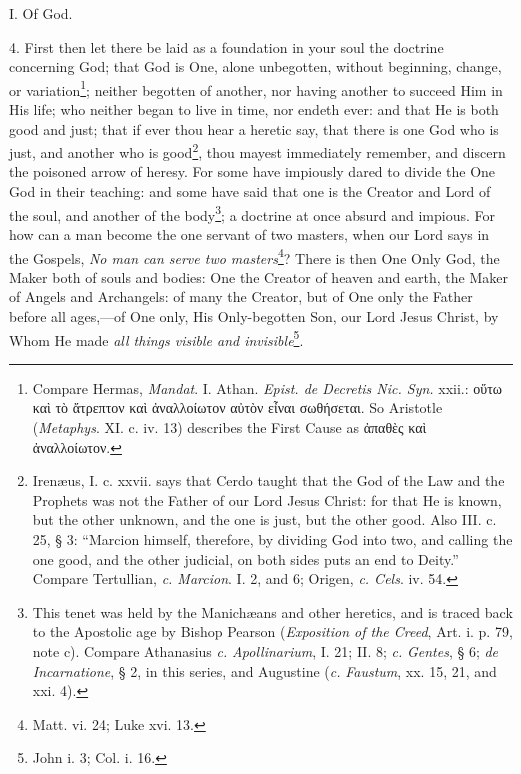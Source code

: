 I. Of God.

4. First then let there be laid as a foundation in your soul the doctrine concerning God; that God is One, alone unbegotten, without beginning, change, or variation\footnote{Compare Hermas, \emph{Mandat}. I. Athan. \emph{Epist. de Decretis Nic. Syn.} xxii.: \textgreek{οὕτω καὶ τὸ ἄτρεπτον καὶ ἀναλλοίωτον αὐτὸν εἶναι σωθήσεται}. So Aristotle (\emph{Metaphys}. XI. c. iv. 13) describes the First Cause as \textgreek{ἀπαθὲς καὶ ἀναλλοίωτον}.}; neither begotten of another, nor having another to succeed Him in His life; who neither began to live in time, nor endeth ever: and that He is both good and just; that if ever thou hear a heretic say, that there is one God who is just, and another who is good\footnote{Irenæus, I. c. xxvii. says that Cerdo taught that the God of the Law and the Prophets was not the Father of our Lord Jesus Christ: for that He is known, but the other unknown, and the one is just, but the other good. Also III. c. 25, § 3: “Marcion himself, therefore, by dividing God into two, and calling the one good, and the other judicial, on both sides puts an end to Deity.” Compare Tertullian, \emph{c. Marcion}. I. 2, and 6; Origen, \emph{c. Cels}. iv. 54.}, thou mayest immediately remember, and discern the poisoned arrow of heresy. For some have impiously dared to divide the One God in their teaching: and some have said that one is the Creator and Lord of the soul, and another of the body\footnote{This tenet was held by the Manichæans and other heretics, and is traced back to the Apostolic age by Bishop Pearson (\emph{Exposition of the Creed}, Art. i. p. 79, note c). Compare Athanasius \emph{c.} \emph{Apollinarium}, I. 21; II. 8; \emph{c.} \emph{Gentes}, § 6; \emph{de Incarnatione}, § 2, in this series, and Augustine (\emph{c.} \emph{Faustum}, xx. 15, 21, and xxi. 4).}; a doctrine at once absurd and impious. For how can a man become the one servant of two masters, when our Lord says in the Gospels, \emph{No man can serve two masters}\footnote{Matt. vi. 24; Luke xvi. 13.}? There is then One Only God, the Maker both of souls and bodies: One the Creator of heaven and earth, the Maker of Angels and Archangels: of many the Creator, but of One only the Father before all ages,—of One only, His Only-begotten Son, our Lord Jesus Christ, by Whom He made \emph{all things visible and invisible}\footnote{John i. 3; Col. i. 16.}.

